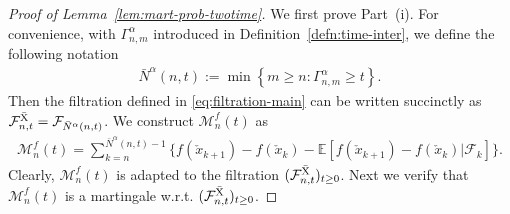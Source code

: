 \documentclass[11pt]{article}
\theoremstyle{plain}
\theoremstyle{definition}
\def\MM{{\mathcal M}}
\def\FM{{\mathcal F}}
\def\EB{{\mathbb E}}
\newcommand{\xcheck}{{\check{x}}}
\newcommand{\xbar}{{\bar{\textnormal{X}}}}
\newcommand{\zbar}{{\bar{\textnormal{Z}}}}
\newcommand{\ssum}[3]{\sum\limits_{{#1}={#2}}^{#3}}
\begin{document}
\begin{appendix}
\begin{proof}[Proof of Lemma~\ref{lem:mart-prob-twotime}]
    We first prove Part~(i).
    For convenience, with $\Gamma^\alpha_{n,m}$ introduced in Definition~\ref{defn:time-inter}, we define the following notation
    \begin{align*}
        \bar{N}^\alpha(n, t) := \min \left\{ m \ge n \colon \Gamma^\alpha_{n, m} \ge t \right\}.
    \end{align*}
    Then the filtration defined in \eqref{eq:filtration-main} can be written succinctly as $\FM^\xbar_{n,t} = \FM_{ \bar{N}^\alpha(n, t) }$.
    We construct $\MM_{n}^f(t)$ as
    \begin{align}\label{eq:Mnf-def}
        \MM_{n}^f(t) = \ssum{k}{n}{\bar{N}^\alpha(n,t)-1} \big\{ f(\xcheck_{k+1}) - f(\xcheck_{k}) - \EB[ f(\xcheck_{k+1}) - f(\xcheck_{k}) | \FM_{k} ] \big\}.
    \end{align}
    Clearly, $\MM_{n}^f(t)$ is adapted to the filtration $(\FM^\xbar_{n,t})_{t \ge 0}$.
    Next we verify that $\MM_{n}^f(t)$ is a martingale w.r.t. $(\FM^\xbar_{n,t})_{t \ge 0}$.
    

\end{proof}
\end{appendix}
\end{document}
